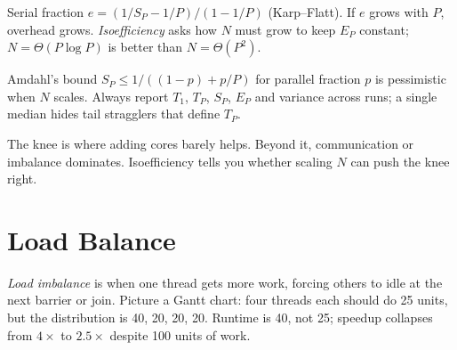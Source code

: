 \begin{definition}
Serial fraction $e=(1/S_P-1/P)/(1-1/P)$ (Karp--Flatt). If $e$ grows with $P$, overhead grows. \emph{Isoefficiency} asks how $N$ must grow to keep $E_P$ constant; $N=\Theta(P\log P)$ is better than $N=\Theta(P^2)$.
\end{definition}

Amdahl's bound $S_P\le 1/((1-p)+p/P)$ for parallel fraction $p$ is pessimistic when $N$ scales. Always report $T_1$, $T_P$, $S_P$, $E_P$ and variance across runs; a single median hides tail stragglers that define $T_P$.

\begin{center}
\end{center}

The knee is where adding cores barely helps. Beyond it, communication or imbalance dominates. Isoefficiency tells you whether scaling $N$ can push the knee right.

\section{Load Balance}\label{sec:balance}
\emph{Load imbalance} is when one thread gets more work, forcing others to idle at the next barrier or join. Picture a Gantt chart: four threads each should do 25 units, but the distribution is 40, 20, 20, 20. Runtime is 40, not 25; speedup collapses from $4\times$ to $2.5\times$ despite 100 units of work.

